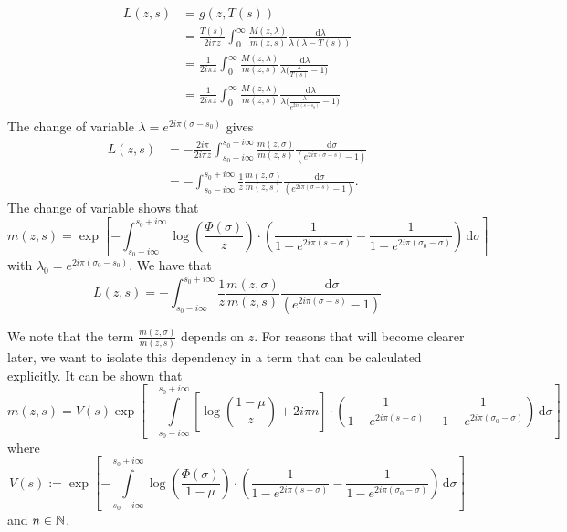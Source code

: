 \documentclass[11pt]{amsart}
\newcommand{\diff}{\,\mathrm{d}}
\begin{document}
\begin{align*}
    L(z,s) &= g(z,T(s)) \\ 
    &= 
    \frac{T(s)}{2i \pi z}\int_0^\infty  \frac{M(z,\lambda)}{m(z,s)} \frac{\diff \lambda}{\lambda(\lambda-T(s))} \\
    &= 
    \frac{1}{2i\pi z}\int_0^\infty  \frac{M(z,\lambda)}{m(z,s)} \frac{\diff \lambda}{\lambda\Big(\frac{\lambda}{T(s)}-1\Big)} \\
    &= 
    \frac{1}{2i\pi z}\int_0^\infty  \frac{M(z,\lambda)}{m(z,s)} \frac{\diff \lambda}{\lambda\Big(\frac{\lambda}{e^{2i\pi(s-s_0)}}-1\Big)} \\
\end{align*}
The change of variable $\lambda = e^{2i\pi(\sigma-s_0)}$ gives
\begin{align*}
    L(z,s)
    &= 
    - \frac{2i\pi }{2i\pi z}\int_{s_0-i\infty}^{s_0+i\infty}  \frac{m(z,\sigma)}{m(z,s)} \frac{\diff \sigma}{(e^{2i\pi(\sigma-s)}-1)} \\
    &= 
   - \int_{s_0-i\infty}^{s_0+i\infty} \frac{1}{z}  \frac{m(z,\sigma)}{m(z,s)} \frac{\diff \sigma}{(e^{2i\pi(\sigma-s)}-1)}. 
\end{align*}
The change of variable shows that
\begin{equation}
    m(z,s) = \exp \left[
    - \int_{s_0-i\infty}^{s_0+i\infty}\log \left( \frac{\Phi(
    \sigma)}{z}\right)
    \cdot \left(
        \frac{1}{1-e^{2i\pi(s-\sigma)}} - \frac{1}{1-e^{2i\pi(\sigma_0-\sigma)}}
     \right) \diff \sigma
    \right]
\end{equation} 
with $\lambda_0 = e^{2i\pi(\sigma_0 - s_0)}$. 
We have that 
\begin{equation}
    L(z,s) 
    = 
   - \int_{s_0-i\infty}^{s_0+i\infty} \frac{1}{z}  \frac{m(z,\sigma)}{m(z,s)} \frac{\diff \sigma}{(e^{2i\pi(\sigma-s)}-1)}
\end{equation}

We note that the term $\frac{m(z,\sigma)}{m(z,s)}$ depends on $z$. For reasons that will become clearer later, we want to isolate this dependency in a term that can be calculated explicitly. 
It can be shown that 
\begin{equation*}
    m(z,s) = V(s)
    \exp \left[
    - \int\limits_{s_0-i\infty}^{s_0+i\infty} \left[\log \left( \frac{1-\mu}{z}\right) + 2i\pi n\right]
    \cdot \left(
        \frac{1}{1-e^{2i\pi(s-\sigma)}} - \frac{1}{1-e^{2i\pi(\sigma_0-\sigma)}}
     \right) \diff \sigma
    \right]
\end{equation*}
where 
$$ V(s) := \exp \left[
    - \int\limits_{s_0-i\infty}^{s_0+i\infty}\log \left( \frac{\Phi(\sigma)}{1-\mu}\right)
    \cdot \left(
        \frac{1}{1-e^{2i\pi(s-\sigma)}} - \frac{1}{1-e^{2i\pi(\sigma_0-\sigma)}}
     \right) \diff \sigma 
    \right]  $$ 
and $n \in \mathbb{N}$.\\
\end{document}
